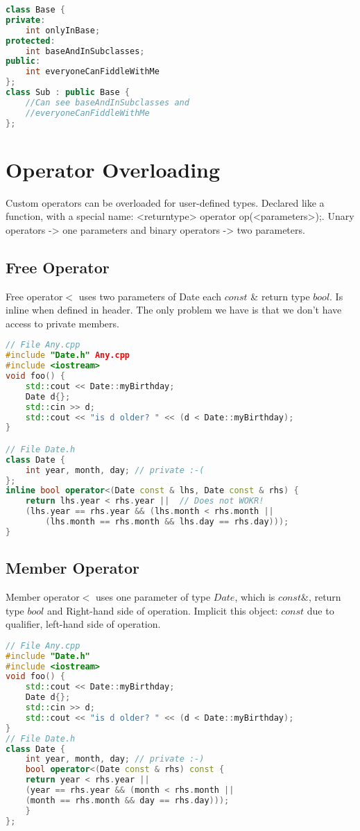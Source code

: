 \begin{lstlisting}[language=C++]
class Base { 
private:
	int onlyInBase; 
protected:
	int baseAndInSubclasses;
public:
	int everyoneCanFiddleWithMe 
};
class Sub : public Base {
	//Can see baseAndInSubclasses and
	//everyoneCanFiddleWithMe 
};	
\end{lstlisting}


\pagebreak
\section{Operator Overloading}
Custom operators can be overloaded for user-defined types. Declared like a function, with a special name: <returntype> operator op(<parameters>);. 
Unary operators -> one parameters and binary operators -> two parameters.

\subsection{Free Operator}
Free operator$<$ uses two parameters of Date each $const$ \& return type $bool$. Is inline when defined in header. The only problem we have is that we don't have access to private members.

\begin{lstlisting}[language=C++]
// File Any.cpp
#include "Date.h" Any.cpp
#include <iostream>
void foo() {
	std::cout << Date::myBirthday;
	Date d{};
	std::cin >> d;
	std::cout << "is d older? " << (d < Date::myBirthday); 
}

// File Date.h
class Date {
	int year, month, day; // private :-( 
};
inline bool operator<(Date const & lhs, Date const & rhs) {
	return lhs.year < rhs.year ||  // Does not WOKR!
	(lhs.year == rhs.year && (lhs.month < rhs.month ||
		(lhs.month == rhs.month && lhs.day == rhs.day)));
}
\end{lstlisting}

\subsection{Member Operator}
Member operator$<$ uses one parameter of type $Date$, which is $const \&$, return type $bool$ and Right-hand side of operation. Implicit this object: $const$ due to qualifier, left-hand side of operation.
\begin{lstlisting}[language=C++]
// File Any.cpp
#include "Date.h" 
#include <iostream>
void foo() {
	std::cout << Date::myBirthday;
	Date d{};
	std::cin >> d;
	std::cout << "is d older? " << (d < Date::myBirthday); 
}
// File Date.h
class Date {
	int year, month, day; // private :-)
	bool operator<(Date const & rhs) const {
	return year < rhs.year ||
	(year == rhs.year && (month < rhs.month ||
	(month == rhs.month && day == rhs.day)));
	} 
};
\end{lstlisting}

